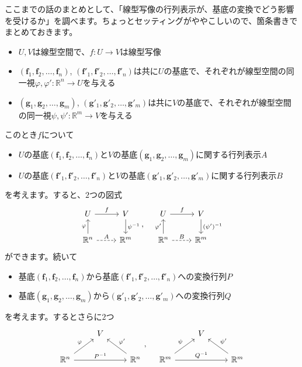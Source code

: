 ここまでの話のまとめとして、「線型写像の行列表示が、基底の変換でどう影響を受けるか」を調べます。ちょっとセッティングがややこしいので、箇条書きでまとめておきます。
\begin{itemize}
\item $U, V$は線型空間で、$f\colon U\rightarrow V$は線型写像
\item $(\bm{f}_1, \bm{f}_2, \ldots, \bm{f}_n)$, $(\bm{f}'_1, \bm{f}'_2, \ldots, \bm{f}'_n)$は共に$U$の基底で、それぞれが線型空間の同一視$\varphi, \varphi'\colon \mathbb{R}^n \rightarrow U$を与える
\item $(\bm{g}_1, \bm{g}_2, \ldots, \bm{g}_m)$, $(\bm{g}'_1, \bm{g}'_2, \ldots, \bm{g}'_m)$は共に$V$の基底で、それぞれが線型空間の同一視$\psi, \psi'\colon \mathbb{R}^m \rightarrow V$を与える
\end{itemize}
このとき$f$について
\begin{itemize}
\item $U$の基底$(\bm{f}_1, \bm{f}_2, \ldots, \bm{f}_n)$と$V$の基底$(\bm{g}_1, \bm{g}_2, \ldots, \bm{g}_m)$に関する行列表示$A$
\item $U$の基底$(\bm{f}'_1, \bm{f}'_2, \ldots, \bm{f}'_n)$と$V$の基底$(\bm{g}'_1, \bm{g}'_2, \ldots, \bm{g}'_m)$に関する行列表示$B$
\end{itemize}
を考えます。すると、$2$つの図式
\[
\begin{tikzcd}
U \arrow{r}{f} & V \arrow{d}{\psi^{-1}} \\
\mathbb{R}^n \arrow{u}{\varphi} \arrow[dashed]{r}{A} & \mathbb{R}^m
\end{tikzcd}, \quad
\begin{tikzcd}
U \arrow{r}{f} & V \arrow{d}{(\psi')^{-1}} \\
\mathbb{R}^n \arrow{u}{\varphi'} \arrow[dashed]{r}{B} & \mathbb{R}^m
\end{tikzcd}
\]
ができます。続いて
\begin{itemize}
\item 基底$(\bm{f}_1, \bm{f}_2, \ldots, \bm{f}_n)$から基底$(\bm{f}'_1, \bm{f}'_2, \ldots, \bm{f}'_n)$への変換行列$P$
\item 基底$(\bm{g}_1, \bm{g}_2, \ldots, \bm{g}_m)$から$(\bm{g}'_1, \bm{g}'_2, \ldots, \bm{g}'_m)$への変換行列$Q$
\end{itemize}
を考えます。するとさらに$2$つ
\[
\begin{tikzcd}
& V & \\
\mathbb{R}^n \arrow{rr}{P^{-1}} \arrow{ur}{\varphi} & & \mathbb{R}^n \arrow{ul}[swap]{\varphi'}
\end{tikzcd}, \quad
\begin{tikzcd}
& V & \\
\mathbb{R}^m \arrow{rr}{Q^{-1}} \arrow{ur}{\psi} & & \mathbb{R}^m \arrow{ul}[swap]{\psi'}
\end{tikzcd}
\]
